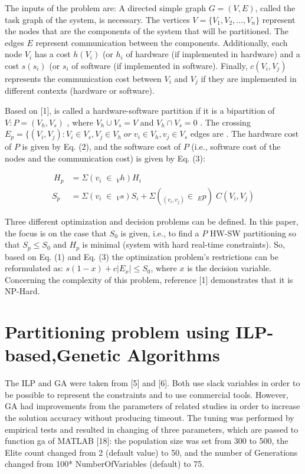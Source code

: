 The inputs of the problem are: A directed simple graph $ G = (V,E) $, called the task graph of the system, is necessary. The vertices $ V = \{V_1,V_2,\dotso,V_n\} $ represent the nodes that are the components of the system that will be partitioned. The edges $ E $ represent communication between the components. Additionally, each node  $ V_i $ has a cost $ h(V_i) $ (or $ h_i $ of hardware (if implemented in hardware) and a cost $ s(s_i) $ (or $ s_i $ of software (if implemented in software). Finally, $ c(V_i,V_j) $ represents the communication cost between $ V_i $ and $ V_j $ if they are implemented in different contexts (hardware or software).

Based on [1],  is called a hardware-software partition if it is a bipartition of $ V:P = (V_h, V_s) $ , where $ V_h \cup V_s = V $  and $ V_h \cap V_s = 0$  . The crossing $ E_p = \{(V_i,V_j):V_i \in V_s, V_j \in V_h \;or\; v_i \in V_h, v_j \in V_s $ edges are . The hardware cost of $ P $  is given by Eq. (2), and the software cost of $ P $ (i.e., software cost of the nodes and the communication cost) is given by Eq. (3):

\begin{align}
\ H_p &= \Sigma (v_i \;\in\; _Vh) H_i\\
  S_p &= \Sigma (v_i \;\in\; _Vs) S_i + \Sigma (_(v_i,v_j) \in\; _Ep)\; C(V_i, V_j)
\end{align}

Three different optimization and decision problems can be defined. In this paper, the focus is on the case that $ S_0 $ is given, i.e., to find a $ P $ HW-SW partitioning so that $ S_p \leq S_0 $ and $ H_p $ is minimal (system with hard real-time constraints). So, based on Eq. (1) and Eq. (3) the optimization problem’s restrictions can be reformulated as: $ s(1-x) + c|E_x| \leq S_0 $, where $ x $ is the decision variable. Concerning the complexity of this problem, reference [1] demonstrates that it is NP-Hard.

\section{Partitioning problem using ILP-based,Genetic Algorithms}
\label{ILPGA}

The ILP and GA were taken from [5] and [6]. Both use slack variables in order to be possible to represent the constraints and to use commercial tools. However, GA had improvements from the parameters of related studies in order to increase the solution accuracy without producing timeout. The tuning was performed by empirical tests and resulted in changing of three parameters, which are passed to function ga of MATLAB [18]: the population size was set from 300 to 500, the Elite count changed from 2 (default value) to 50, and the number of Generations changed from 100* NumberOfVariables (default) to 75.

